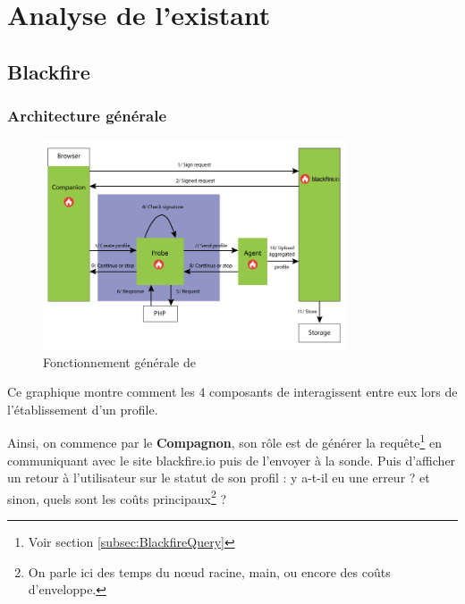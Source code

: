 \part{Analyse de l'existant}
\thispagestyle{part}
\parttoc

	\chapter{Blackfire}
	\label{chap:Blackfire}
		\section{Architecture générale}
	
\begin{figure}[!h]
\begin{center}
  \includegraphics[width=0.8\textwidth]{images/schemas/workflow/general-workflow}
  \caption{Fonctionnement générale de \Blackfire}
\end{center}
\end{figure}

Ce graphique montre comment les 4 composants de \Blackfire interagissent entre eux lors de l'établissement d'un profile.
 
Ainsi, on commence par le \textbf{Compagnon}, son rôle est de générer la requête\footnote{Voir section \vref{subsec:BlackfireQuery}} en communiquant avec le site blackfire.io puis de l'envoyer à la sonde. Puis d'afficher un retour à l'utilisateur sur le statut de son profil : y a-t-il eu une erreur ? et sinon, quels sont les coûts principaux\footnote{On parle ici des temps du nœud racine, main, ou encore des coûts d'enveloppe.} ?

